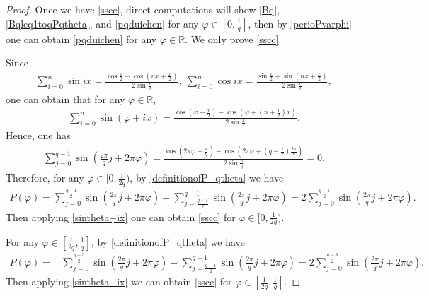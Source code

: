 \documentclass[12pt]{amsart}
\theoremstyle{plain}
\theoremstyle{definition}
\begin{document}
	\begin{proof}
		Once we have \eqref{sscc}, direct computations will show  \eqref{Bq}, \eqref{Bqleq1toqPqtheta}, and \eqref{pqduichen} for any $\varphi\in\left[0,\frac{1}{q}\right]$, then by \eqref{perioPvarphi}
one can obtain		
		 \eqref{pqduichen} for any $\varphi\in\mathbb{R}$.
		We only prove \eqref{sscc}.
		
		Since 
		\begin{align}
			\sum_{i=0}^n\sin ix=\frac{\cos\frac{x}{2}-\cos\left(nx+\frac{x}{2}\right)}{2\sin\frac{x}{2}},\ \sum_{i=0}^n\cos ix=\frac{\sin\frac{x}{2}+\sin\left(nx+\frac{x}{2}\right)}{2\sin\frac{x}{2}},\label{sinixcosix}
		\end{align}
		one can obtain that for any $\varphi\in\mathbb{R}$,
		\begin{align}
			\sum_{i=0}^n\sin (\varphi+ix)=\frac{\cos\left(\varphi-\frac{x}{2}\right)-\cos\left(\varphi+\left(n+\frac{1}{2}\right)x\right)}{2\sin\frac{x}{2}}.\label{sintheta+ix}
		\end{align}
		Hence, one has
		\begin{align}
			\sum_{j=0}^{q-1}\sin\left(\frac{2\pi}{q}j+2\pi\varphi\right)=\frac{\cos\left(2\pi\varphi-\frac{\pi}{q}\right)-\cos\left(2\pi\varphi+(q-\frac{1}{2})\frac{2\pi}{q}\right)}{2\sin\frac{\pi}{q}}=0.\nonumber
		\end{align}
		Therefore, for any $\varphi\in\Big[0,\frac{1}{2q}\Big)$, by \eqref{definitionofP_qtheta} we have
		\begin{align}
			P(\varphi)=\sum_{j=0}^{\frac{q-1}{2}}\sin\left(\frac{2\pi}{q}j+2\pi\varphi\right)-\sum_{j=\frac{q+1}{2}}^{q-1}\sin\left(\frac{2\pi}{q}j+2\pi\varphi\right)
			=2\sum_{j=0}^{\frac{q-1}{2}}\sin\left(\frac{2\pi}{q}j+2\pi\varphi\right).\nonumber
		\end{align}
		Then applying \eqref{sintheta+ix} one can obtain \eqref{sscc} for $\varphi\in\Big[0,\frac{1}{2q}\Big)$.
		
		For any $\varphi\in\left[\frac{1}{2q},\frac{1}{q}\right]$, by \eqref{definitionofP_qtheta} we have
		\begin{align}
			P(\varphi)=&\sum_{j=0}^{\frac{q-3}{2}}\sin\left(\frac{2\pi}{q}j+2\pi\varphi\right)-\sum_{j=\frac{q-1}{2}}^{q-1}\sin\left(\frac{2\pi}{q}j+2\pi\varphi\right)
			=2\sum_{j=0}^{\frac{q-3}{2}}\sin\left(\frac{2\pi}{q}j+2\pi\varphi\right).\nonumber
		\end{align}
		Then applying \eqref{sintheta+ix} we can obtain \eqref{sscc} for $\varphi\in\left[\frac{1}{2q},\frac{1}{q}\right]$.
	\end{proof}
	
\end{document}
